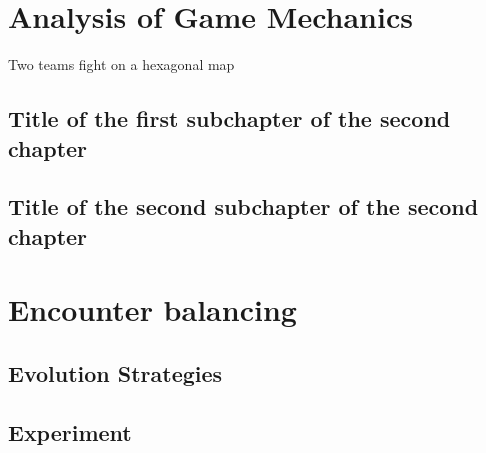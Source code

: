 \chapter{Analysis of Game Mechanics}

Two teams fight on a hexagonal map 


\section{Title of the first subchapter of the second chapter}

\section{Title of the second subchapter of the second chapter}

\chapter{Encounter balancing}

\section{Evolution Strategies}



\section{Experiment}
